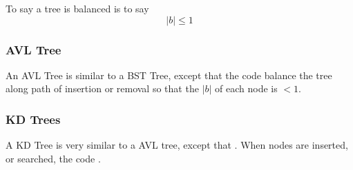     \begin{definition}
      To say a tree is balanced is to say 
      \begin{equation}
        \left| b \right| \leq 1
      \end{equation}
    \end{definition}
    
  \subsubsection{AVL Tree}

    \begin{definition}
      An AVL Tree is similar to a BST Tree, except that the 
       code balance the tree along path of 
      insertion or removal so that the $ \left| b \right| $ of each node 
      is $ < 1 $. 
    \end{definition}
    
  \subsubsection{KD Trees}

    \begin{definition}
      A KD Tree is very similar to a AVL tree, except that 
      . When nodes 
      are inserted, or searched, the code 
      .
    \end{definition}